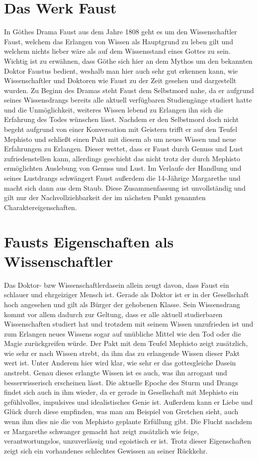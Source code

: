 \documentclass[12pt]{scrreprt}
\begin{document}
\section{Das Werk Faust}
	\label{sec:das werk faust}
In Göthes Drama Faust aus dem Jahre 1808 geht es um den Wissenschaftler Faust, welchem das Erlangen von Wissen als Hauptgrund zu leben gilt und welchem nichts lieber wäre als auf dem Wissensstand eines Gottes zu sein.
Wichtig ist zu erwähnen, dass Göthe sich hier an dem Mythos um den bekannten Doktor Faustus bedient, weshalb man hier auch sehr gut erkennen kann, wie Wissenschaftler und Doktoren wie Faust zu der Zeit gesehen und dargestellt wurden.
Zu Beginn des Dramas steht Faust dem Selbstmord nahe, da er aufgrund seines Wissensdrangs bereits alle aktuell verfügbaren Studiengänge studiert hatte und die Unmöglichkeit, weiteres Wissen lebend zu Erlangen ihn sich die Erfahrung des Todes wünschen lässt.
Nachdem er den Selbstmord doch nicht begeht aufgrund von einer Konversation mit Geistern trifft er auf den Teufel Mephisto und schließt einen Pakt mit diesem ab um neues Wissen und neue Erfahrungen zu Erlangen.
Dieser wettet, dass er Faust durch Genuss und Lust zufriedenstellen kann, allerdings geschieht das nicht trotz der durch Mephisto ermöglichten Auslebung von Genuss und Lust.
Im Verlaufe der Handlung und seines Lustdrangs schwängert Faust außerdem die 14-Jährige Margarethe und macht sich dann aus dem Staub.
Diese Zusammenfassung ist unvollständig und gilt nur der Nachvollziehbarkeit der im nächsten Punkt genannten Charaktereigenschaften.
\section{Fausts Eigenschaften als Wissenschaftler}
	\label{sec:fausts Eigenschaften}
Das Doktor- bzw Wissenschaftlerdasein allein zeugt davon, dass Faust ein schlauer und ehrgeiziger Mensch ist.
Gerade als Doktor ist er in der Gesellschaft hoch angesehen und gilt als Bürger der gehobenen Klasse.
Sein Wissensdrang kommt vor allem dadurch zur Geltung, dass er alle aktuell studierbaren Wissenschaften studiert hat und trotzdem mit seinem Wissen unzufrieden ist und zum Erlangen neues Wissens sogar auf unübliche Mittel wie den Tod oder die Magie zurückgreifen würde.
Der Pakt mit dem Teufel Mephisto zeigt zusätzlich, wie sehr er nach Wissen strebt, da ihm das zu erlangende Wissen dieser Pakt wert ist.
Unter Anderem hier wird klar, wie sehr er das gottesgleiche Dasein anstrebt.
Genau dieses erlangte Wissen ist es auch, was ihn arrogant und besserwisserisch erscheinen lässt.
Die aktuelle Epoche des Sturm und Drangs findet sich auch in ihm wieder, da er gerade in Gesellschaft mit Mephisto ein gefühlvolles, impulsives und idealistisches Genie ist.
Außerdem kann er Liebe und Glück durch diese empfinden, was man am Beispiel von Gretchen sieht, auch wenn ihm dies nie die von Mephisto geplante Erfüllung gibt.
Die Flucht nachdem er Margarethe schwanger gemacht hat zeigt zusätzlich wie feige, verantwortungslos, unzuverlässig und egoistisch er ist.
Trotz dieser Eigenschaften zeigt sich ein vorhandenes schlechtes Gewissen an seiner Rückkehr.
\autocite{wiki:Faust_Studyflix}
\autocite{wiki:Faust_Studysmarter}
\end{document}
